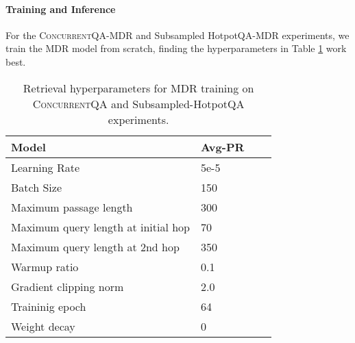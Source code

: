 \documentclass{article}
\newcommand{\datasetname}{\textsc{ConcurrentQA}\xspace}
\begin{document}
\paragraph{Training and Inference} For the \datasetname-MDR and Subsampled HotpotQA-MDR experiments, we train the MDR model from scratch, finding the hyperparameters in Table \ref{tab:hyperparams_retrieval} work best.
\begin{table}[t!]
    \begin{center}
    \normalsize
    \begin{tabular}{llcc}
    \toprule
    Model  &    Avg-PR    \\
    \midrule
    Learning Rate                       & 5e-5 \\
    Batch Size                          & 150   \\
    Maximum passage length              & 300  \\
    Maximum query length at initial hop & 70   \\
    Maximum query length at 2nd hop     & 350  \\
    Warmup ratio                        & 0.1  \\
    Gradient clipping norm              & 2.0 \\
    Traininig epoch                     & 64   \\
    Weight decay                        & 0    \\
    \bottomrule
    \end{tabular}
    \normalsize
    \caption{Retrieval hyperparameters for MDR training on \datasetname and Subsampled-HotpotQA experiments.}
    \vspace{2mm}
    \label{tab:hyperparams_retrieval}
    \end{center}
\end{table}
\end{document}
